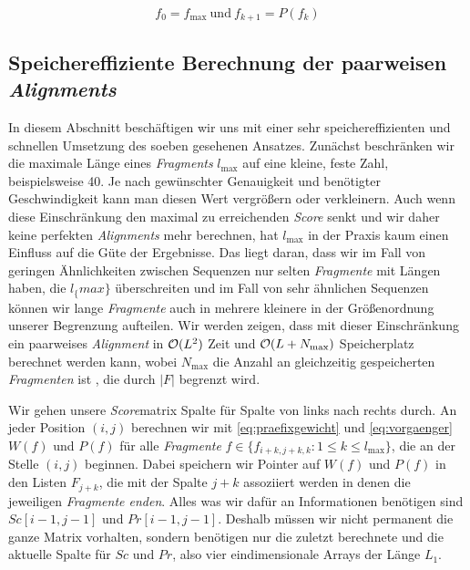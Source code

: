 \begin{equation}\label{eq:backtracking}
	f_0 = f_{\max}\: \text{und}\: f_{k+1} = P(f_k)
\end{equation} 

\subsection{Speichereffiziente Berechnung der paarweisen \emph{Alignments}}

In diesem Abschnitt beschäftigen wir uns mit einer sehr speichereffizienten und schnellen Umsetzung des soeben gesehenen Ansatzes. Zunächst beschränken wir die maximale Länge eines \emph{Fragments} $l_{\max}$ auf eine kleine, feste Zahl, beispielsweise 40. Je nach gewünschter Genauigkeit und benötigter Geschwindigkeit kann man diesen Wert vergrößern oder verkleinern. Auch wenn diese Einschränkung den maximal zu erreichenden \emph{Score} senkt und wir daher keine perfekten \emph{Alignments} mehr berechnen, hat $l_{\max}$ in der Praxis kaum einen Einfluss auf die Güte der Ergebnisse. Das liegt daran, dass wir im Fall von geringen Ähnlichkeiten zwischen Sequenzen nur selten \emph{Fragmente} mit Längen haben, die $l_\{max\}$ überschreiten und im Fall von sehr ähnlichen Sequenzen können wir lange \emph{Fragmente} auch in mehrere kleinere in der Größenordnung unserer Begrenzung aufteilen. Wir werden zeigen, dass mit dieser Einschränkung ein paarweises \emph{Alignment} in $\mathcal{O}(L^2)$ Zeit und $\mathcal{O}(L+N_{\max})$ Speicherplatz berechnet werden kann, wobei $N_{\max}$ die Anzahl an gleichzeitig gespeicherten \emph{Fragmenten} ist \citep{m02}, die durch $|F|$ begrenzt wird.

Wir gehen unsere \emph{Score}matrix Spalte für Spalte von links nach rechts durch. An jeder Position $(i,j)$ berechnen wir mit \ref{eq:praefixgewicht} und \ref{eq:vorgaenger} $W(f)$ und $P(f)$ für alle \emph{Fragmente }$f \in \{f_{i+k,j+k,k} : 1 \leq k \leq l_{\max}\}$, die an der Stelle $(i,j)$ beginnen. Dabei speichern wir Pointer auf $W(f)$ und $P(f)$ in den Listen $F_{j+k}$, die mit der Spalte $j+k$ assoziiert werden in denen die jeweiligen \emph{Fragmente enden}. Alles was wir dafür an Informationen benötigen sind $Sc[i\!-\!1,j\!-\!1]$ und $Pr[i\!-\!1,j\!-\!1]$. Deshalb müssen wir nicht permanent die ganze Matrix vorhalten, sondern benötigen nur die zuletzt berechnete und die aktuelle Spalte für $Sc$ und $Pr$, also vier eindimensionale Arrays der Länge $L_1$.



